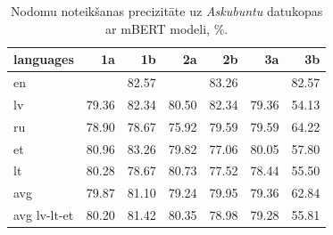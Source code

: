 \begin{table}[htbp]
  \centering
  \caption{Nodomu noteikšanas precizitāte uz \textit{Askubuntu} datukopas ar mBERT modeli, \%.}
    \begin{tabular}{lrrrrrr} \toprule
    languages & 1a & 1b & 2a & 2b & 3a & 3b \\\midrule
    en    &       & \cellcolor[rgb]{ .475,  .627,  .82}82.57 &       & \cellcolor[rgb]{ .357,  .545,  .78}83.26 &       & \cellcolor[rgb]{ .475,  .627,  .82}82.57 \\
    lv    & \cellcolor[rgb]{ .984,  .98,  .992}79.36 & \cellcolor[rgb]{ .514,  .655,  .835}82.34 & \cellcolor[rgb]{ .831,  .878,  .945}80.50 & \cellcolor[rgb]{ .514,  .655,  .835}82.34 & \cellcolor[rgb]{ .984,  .98,  .992}79.36 & \cellcolor[rgb]{ .973,  .412,  .42}54.13 \\
    ru    & \cellcolor[rgb]{ .984,  .973,  .98}78.90 & \cellcolor[rgb]{ .984,  .965,  .976}78.67 & \cellcolor[rgb]{ .984,  .902,  .914}75.92 & \cellcolor[rgb]{ .988,  .988,  1}79.59 & \cellcolor[rgb]{ .988,  .988,  1}79.59 & \cellcolor[rgb]{ .976,  .639,  .647}64.22 \\
    et    & \cellcolor[rgb]{ .753,  .824,  .918}80.96 & \cellcolor[rgb]{ .353,  .541,  .776}83.26 & \cellcolor[rgb]{ .949,  .961,  .988}79.82 & \cellcolor[rgb]{ .984,  .929,  .941}77.06 & \cellcolor[rgb]{ .91,  .933,  .973}80.05 & \cellcolor[rgb]{ .973,  .494,  .502}57.80 \\
    lt    & \cellcolor[rgb]{ .871,  .906,  .961}80.28 & \cellcolor[rgb]{ .984,  .965,  .976}78.67 & \cellcolor[rgb]{ .792,  .851,  .933}80.73 & \cellcolor[rgb]{ .984,  .941,  .949}77.52 & \cellcolor[rgb]{ .984,  .961,  .973}78.44 & \cellcolor[rgb]{ .973,  .439,  .451}55.50 \\\midrule
    avg   & \cellcolor[rgb]{ .941,  .957,  .984}79.87 & \cellcolor[rgb]{ .729,  .804,  .91}81.10 & \cellcolor[rgb]{ .984,  .98,  .992}79.24 & \cellcolor[rgb]{ .925,  .945,  .98}79.95 & \cellcolor[rgb]{ .984,  .98,  .992}79.36 & \cellcolor[rgb]{ .976,  .608,  .616}62.84 \\
    avg lv-lt-et & \cellcolor[rgb]{ .886,  .918,  .965}80.20 & \cellcolor[rgb]{ .675,  .769,  .89}81.42 & \cellcolor[rgb]{ .859,  .898,  .957}80.35 & \cellcolor[rgb]{ .984,  .973,  .984}78.98 & \cellcolor[rgb]{ .984,  .98,  .992}79.28 & \cellcolor[rgb]{ .973,  .447,  .455}55.81 \\\bottomrule
    \end{tabular}%
  \label{tab:askubuntu-bert}%
\end{table}%


